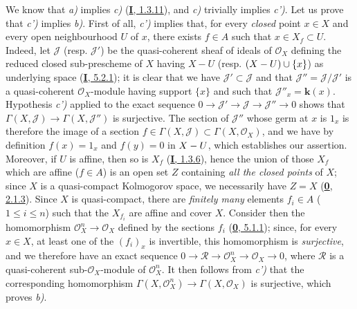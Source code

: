 We know that \emph{a)} implies \emph{c)} (\hyperref[I.1.3.11]{\textbf{I}, 1.3.11}), and \emph{c)}
trivially implies \emph{c')}. Let us prove that \emph{c')} implies \emph{b)}. First of all, \emph{c')}
implies that, for every \emph{closed} point $x\in X$ and every open neighbourhood
$U$ of $x$, there exists $f\in A$ such that $x\in X_f\subset U$. Indeed, let
$\mathcal{J}$ (resp. $\mathcal{J}'$) be the quasi-coherent sheaf of ideals of
$\mathcal{O}_X$ defining the reduced closed sub-prescheme of $X$ having
$X-U$ (resp. $(X- U)\cup\{x\}$) as underlying space
(\hyperref[I.5.2.1]{\textbf{I}, 5.2.1}); it is clear that we have
$\mathcal{J}'\subset\mathcal{J}$ and that
$\mathcal{J}''=\mathcal{J}/\mathcal{J}'$ is a quasi-coherent
$\mathcal{O}_X$-module having support $\{x\}$ and such that
$\mathcal{J}''_x=\boldsymbol{k}(x)$. Hypothesis \emph{c')} applied to the exact sequence
$0\to\mathcal{J}'\to\mathcal{J}\to\mathcal{J}''\to0$ shows that
$\Gamma(X,\mathcal{J})\to\Gamma(X,\mathcal{J}'')$ is surjective. The section
of $\mathcal{J}''$ whose germ at $x$ is $1_x$ is therefore the image of a
section $f\in\Gamma(X,\mathcal{J})\subset\Gamma(X,\mathcal{O}_X)$, and we have
by definition $f(x)=1_x$ and $f(y)=0$ in $X- U$, which establishes our
assertion. Moreover, if $U$ is affine, then so is $X_f$
(\hyperref[I.1.3.6]{\textbf{I}, 1.3.6}), hence the union of those $X_f$ which are
affine ($f\in A$) is an open set $Z$ containing \emph{all the closed points} of
$X$; since $X$ is a quasi-compact Kolmogorov space, we necessarily have
$Z=X$ (\hyperref[0.2.1.3]{\textbf{0}, 2.1.3}). Since $X$ is
quasi-compact, there are \emph{finitely many} elements $f_i\in A$
($1\leq i\leq n$) such that the $X_{f_i}$ are affine and cover $X$.
Consider then the homomorphism $\mathcal{O}_X^n\to\mathcal{O}_X$ defined
by the sections $f_i$ (\hyperref[0.5.1.1]{\textbf{0}, 5.1.1}); since, for every
$x\in X$, at least one of the $(f_i)_x$ is invertible, this homomorphism is
\emph{surjective}, and we therefore have an exact sequence
$0\to\mathcal{R}\to\mathcal{O}_X^n\to\mathcal{O}_X\to0$, where $\mathcal{R}$
is a quasi-coherent sub-$\mathcal{O}_X$-module of $\mathcal{O}_X^n$. It
then follows
from \emph{c')} that the corresponding homomorphism
$\Gamma(X,\mathcal{O}_X^n)\to\Gamma(X,\mathcal{O}_X)$ is surjective, which
proves \emph{b)}.

